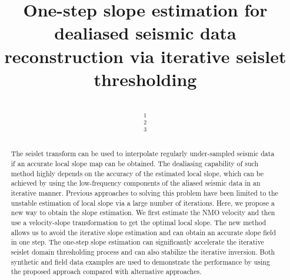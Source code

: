 \title{One-step slope estimation for dealiased seismic data reconstruction via iterative seislet thresholding}
\renewcommand{\thefootnote}{\fnsymbol{footnote}}
\author{\\
$^1$ \\
$^2$\\
$^3$ \\
}
\maketitle

\begin{abstract}
The seislet transform can be used to interpolate regularly under-sampled seismic data if an accurate local slope map can be obtained. The dealiasing capability of such method highly depends on the accuracy of the estimated local slope, which can be achieved by using the low-frequency components of the aliased seismic data in an iterative manner. Previous approaches to solving this problem have been limited to the unstable estimation of local slope via a large number of iterations. Here, we propose a new way to obtain the slope estimation. We first estimate the NMO velocity and then use a velocity-slope transformation to get the optimal local slope. The new method allows us to avoid the iterative slope estimation and can obtain an accurate slope field in one step. The one-step slope estimation can significantly accelerate the iterative seislet domain thresholding process and can also stabilize the iterative inversion. Both synthetic and field data examples are used to demonstrate the performance by using the proposed approach compared with alternative approaches. 
\end{abstract}

